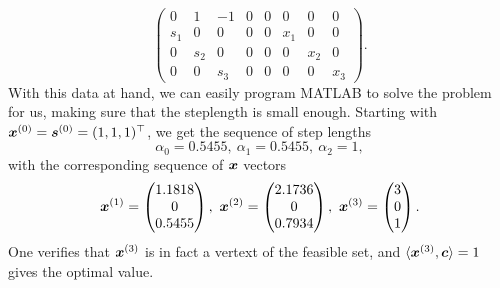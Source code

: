 \begin{example}
\begin{equation*}
\begin{pmatrix}
                                0 & 1 & -1 & 0 & 0 & 0 & 0 & 0 \\
                                s_1 & 0 & 0 & 0 & 0 & x_1 & 0 & 0 \\
                                0 & s_2 & 0 & 0 & 0 & 0 & x_2 & 0\\
                                0 & 0 & s_3 & 0 & 0 & 0 & 0 & x_3
                               \end{pmatrix}.
\end{equation*}
With this data at hand, we can easily program MATLAB to solve the problem for us, making sure that the steplength is small enough. Starting with $\bm{x}^{(0)}=\bm{s}^{(0)}=(1,1,1)^\top$, we get the sequence of step lengths
\begin{equation*}
 \alpha_0 = 0.5455, \ \alpha_1=0.5455, \ \alpha_2 = 1,
\end{equation*}
with the corresponding sequence of $\bm{x}$ vectors
\begin{equation*}
 \vct{x}^{(1)} = \begin{pmatrix}
                  1.1818\\ 0\\ 0.5455
                 \end{pmatrix}, \ 
 \vct{x}^{(2)} = \begin{pmatrix}
                  2.1736\\ 0 \\ 0.7934
                 \end{pmatrix}, \
 \vct{x}^{(3)} = \begin{pmatrix}
                  3 \\ 0 \\ 1
                 \end{pmatrix}.
\end{equation*}
One verifies that $\bm{x}^{(3)}$ is in fact a vertext of the feasible set, and $\langle {\bm{x}^{(3)}}, {\bm{c}} \rangle=1$ gives the optimal value. 
 \end{example}

